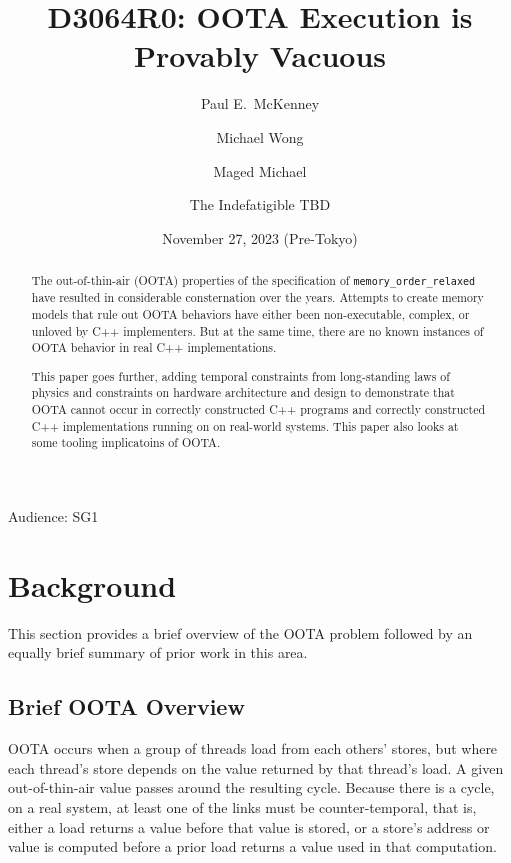 \documentclass[10]{article}
\begin{document}
\title{D3064R0: OOTA Execution is Provably Vacuous}

\newcommand{\co}[1]{\lstinline[breaklines=yes,breakatwhitespace=yes]{#1}}

\author{
Paul E.~McKenney\\ \and
Michael Wong\\ \and
Maged Michael\\ \and
The Indefatigible TBD
}
\date{November 27, 2023 (Pre-Tokyo)}
\maketitle{}

Audience: SG1

\begin{abstract}
	The out-of-thin-air (OOTA) properties of the specification
	of \co{memory_order_relaxed} have resulted in considerable
	consternation over the years.
	Attempts to create memory models that rule out OOTA behaviors
	have either been non-executable, complex, or unloved by C++
	implementers.
	But at the same time, there are no known instances of OOTA
	behavior in real C++ implementations.

	This paper goes further, adding temporal constraints from
	long-standing laws of physics and constraints on hardware
	architecture and design to demonstrate that OOTA cannot occur in
	correctly constructed C++ programs and correctly constructed C++
	implementations running on on real-world systems.
	This paper also looks at some tooling implicatoins of OOTA.
\end{abstract}

\section{Background}
\label{sec:Background}

This section provides a brief overview of the OOTA problem followed
by an equally brief summary of prior work in this area.

\subsection{Brief OOTA Overview}
\label{sec:Brief OOTA Overview}

OOTA occurs when a group of threads load from each others' stores,
but where each thread's store depends on the value returned by that
thread's load.
A given out-of-thin-air value passes around the resulting cycle.
Because there is a cycle, on a real system, at least one of the links
must be counter-temporal, that is, either a load returns a value before
that value is stored, or a store's address or value is computed before
a prior load returns a value used in that computation.
\end{document}
